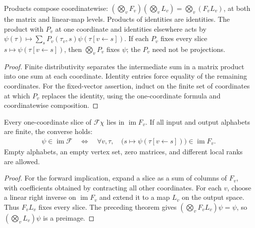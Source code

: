 \begin{lemma}%
    \label{thm:peps_dependent_product_calculus}
    \leanok
    Products compose coordinatewise: $(\bigotimes_vF_v)(\bigotimes_vL_v)
        =\bigotimes_v(F_vL_v)$, at both the matrix and linear-map levels.
    Products of identities are identities. The product with $P_v$ at one
    coordinate and identities elsewhere acts by
    $\psi(\tau)\mapsto\sum_sP_v(\tau_v,s)\psi(\tau[v\leftarrow s])$.
    If each $P_v$ fixes every slice $s\mapsto\psi(\tau[v\leftarrow s])$,
    then $\bigotimes_vP_v$ fixes $\psi$; the $P_v$ need not be projections.
\end{lemma}
\begin{proof}\leanok
    Finite distributivity separates the intermediate sum in a matrix product
    into one sum at each coordinate. Identity entries force equality of
    the remaining coordinates. For the fixed-vector assertion, induct on
    the finite set of coordinates at which $P_v$ replaces the identity,
    using the one-coordinate formula and coordinatewise composition.
\end{proof}

\begin{lemma}%
    \label{thm:peps_dependent_product_range}
    \leanok
    Every one-coordinate slice of $\mathcal F\chi$ lies in
    $\operatorname{im}F_v$. If all input and output alphabets are finite,
    the converse holds:
    \begin{align}
        \psi\in\operatorname{im}\mathcal F
        \quad\Longleftrightarrow\quad
        \forall v,\tau,\quad
        \bigl(s\mapsto\psi(\tau[v\leftarrow s])\bigr)\in\operatorname{im}F_v.
        \label{eq:peps_dependent_product_range}
    \end{align}
    Empty alphabets, an empty vertex set, zero matrices, and different local
    ranks are allowed.
\end{lemma}
\begin{proof}\leanok
    For the forward implication, expand a slice as a sum of columns of
    $F_v$, with coefficients obtained by contracting all other coordinates.
    For each $v$, choose a linear right inverse on $\operatorname{im}F_v$
    and extend it to a map $L_v$ on the output space. Thus $F_vL_v$ fixes
    every slice. The preceding theorem gives
    $(\bigotimes_vF_vL_v)\psi=\psi$, so $(\bigotimes_vL_v)\psi$ is a preimage.
\end{proof}
